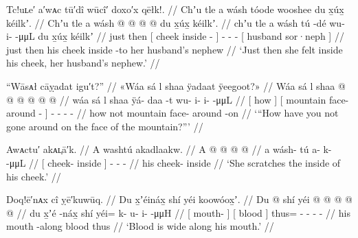\ex\label{ex:91-18-she-felt-inside-his-cheek}%
%
\begingl
	\glpreamble	Tc!uʟe′ a′wᴀc tū′dî wūcî′ doxo′x qēłk!. //
	\glpreamble	Chʼu tle a wásh tóode wooshee du x̱úx̱ kéilkʼ. //
	\gla	Chʼu tle {} a wásh  @ {} {}
		 @ {} @ {} @ {}
		{} du x̱úx̱ kéilkʼ. {} //
	\glb	chʼu tle {} a wásh tú -dé {}
		wu- i-  -μμL
		{} du x̱úx̱ kéilkʼ {} //
	\glc	just then {}[  cheek inside - {}]
		- -  -
		{}[  husband sor·neph {}] //
	\gld	just then {} his cheek inside -to {}
		 {} {} {}
		{} her husband’s nephew {} //
	\glft	‘Just then she felt inside his cheek, her husband’s nephew.’
		//
\endgl
\xe

\ex\label{ex:91-19-why-not-go-around-on-mountain}%
%
\begingl
	\glpreamble	“Wāsᴀł cāỵadat igu′t?” //
	\glpreamble	«\!Wáa sá l shaa ÿadaat ÿeegoot?\!» //
	\gla	{} Wáa sá {}
		l {} shaa  @ {} @ {} {}
		 @ {} @ {} @ {} @ {} //
	\glb	{} wáa sá {}
		l {} shaa ÿá- daa -t {}
		wu- i- i-  -μμL //
	\glc	{}[ how  {}]
		 {}[ mountain face- around - {}]
		- - -  - //
	\gld	{} how  {}
		not {} mountain face- around -on {}
		 {} {} {} {} //
	\glft	‘“How have you not gone around on the face of the mountain?”’
		//
\endgl
\xe

\ex\label{ex:91-20-scratch-inside-cheek}%
%
\begingl
	\glpreamble	Awᴀctu′ akᴀʟ̣ā′k. //
	\glpreamble	A washtú akadlaakw. //
	\gla	{} A  @ {} {}
		 @ {} @ {} @ {} //
	\glb	{} a wásh- tú {}
		a- k-  -μμL //
	\glc	{}[  cheek- inside {}]
		- -  - //
	\gld	{} his cheek- inside {}
		 {} {} {} //
	\glft	‘She scratches the inside of his cheek.’
		//
\endgl
\xe

\ex\label{ex:91-21-blood-wide-along-mouth}%
%
\begingl
	\glpreamble	Doq!ē′nᴀx cî ỵē′kuwūq. //
	\glpreamble	Du x̱ʼéináx̱ shí yéi koowóox̱ʼ. //
	\gla	{} Du  @ {} {}
		{} shí {}
		yéi @  @ {} @ {} @ {} @ {} //
	\glb	{} du x̱ʼé -náx̱ {}
		{} shí {}
		yéi= k- u- i-  -μμH //
	\glc	{}[  mouth-  {}]
		{}[ blood {}]
		thus= - - -  - //
	\gld	{} his mouth -along {}
		{} blood {}
		thus\•  {} {} {} {} //
	\glft	‘Blood is wide along his mouth.’
		//
\endgl
\xe

